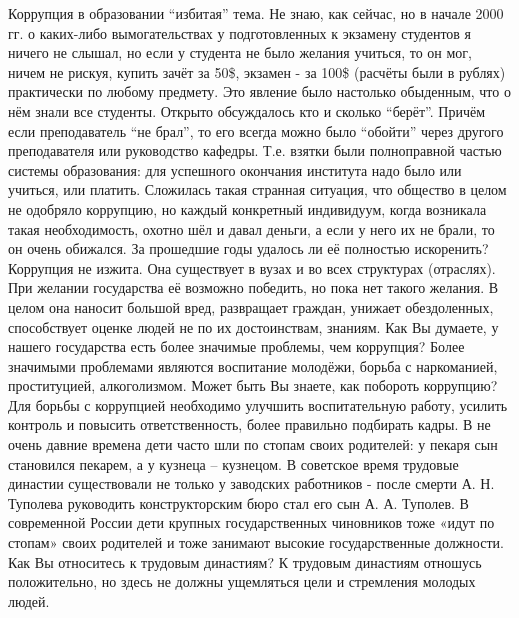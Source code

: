 \begin{drama}
	\maxspeaks Коррупция в образовании “избитая” тема. Не знаю, как сейчас, но в начале 2000 гг. о каких-либо вымогательствах у подготовленных к экзамену студентов я ничего не слышал, но если у студента не было желания учиться, то он мог, ничем не рискуя, купить зачёт за 50\$, экзамен - за 100\$ (расчёты были в рублях) практически по любому предмету. Это явление было настолько обыденным, что о нём знали все студенты. Открыто обсуждалось кто и сколько “берёт”. Причём если преподаватель “не брал”, то его всегда можно было “обойти” через другого преподавателя или руководство кафедры. Т.е. взятки были полноправной частью системы образования: для успешного окончания института надо было или учиться, или платить. Сложилась такая странная ситуация, что общество в целом не одобряло коррупцию, но каждый конкретный индивидуум, когда возникала такая необходимость, охотно шёл и давал деньги, а если у него их не брали, то он очень обижался. За прошедшие годы удалось ли её полностью искоренить?
	\michaelspeaks Коррупция не изжита. Она существует в вузах и во всех структурах (отраслях). При желании государства её возможно победить, но пока нет такого желания. В целом она наносит большой вред, развращает граждан, унижает обездоленных, способствует оценке людей не по их достоинствам, знаниям.
	\maxspeaks Как Вы думаете, у нашего государства есть более значимые проблемы, чем коррупция?
	\michaelspeaks Более значимыми проблемами являются воспитание молодёжи, борьба с наркоманией, проституцией, алкоголизмом.
	\maxspeaks Может быть Вы знаете, как побороть коррупцию? 
	\michaelspeaks Для борьбы с коррупцией необходимо улучшить воспитательную работу, усилить контроль и повысить ответственность, более правильно подбирать кадры.
	\maxspeaks В не очень давние времена дети часто шли по стопам своих родителей: у пекаря сын становился пекарем, а у кузнеца – кузнецом. В советское время трудовые династии существовали не только у заводских работников - после смерти А. Н. Туполева руководить конструкторским бюро стал его сын А. А. Туполев. В современной России дети крупных государственных чиновников тоже «идут по стопам» своих родителей и тоже занимают высокие государственные должности. Как Вы относитесь к трудовым династиям?
	\michaelspeaks К трудовым династиям отношусь положительно, но здесь не должны ущемляться цели и стремления молодых людей.
	

\end{drama}
